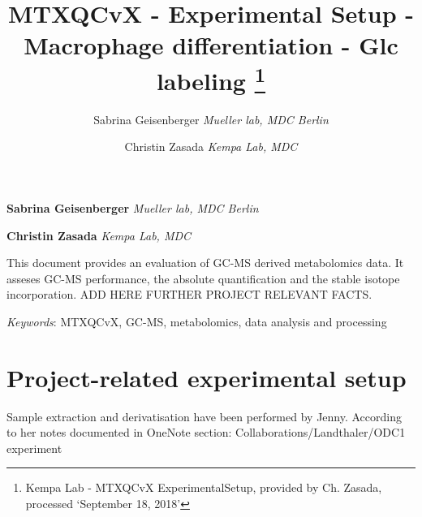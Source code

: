 \documentclass[10pt,]{article}
\title{MTXQCvX - Experimental Setup - Macrophage differentiation - Glc labeling \thanks{Kempa Lab - MTXQCvX ExperimentalSetup, provided by Ch. Zasada, processed
`September 18, 2018'}  }
\author{\Large Sabrina Geisenberger\vspace{0.05in} \newline\normalsize\emph{Mueller lab, MDC Berlin}   \and \Large Christin Zasada\vspace{0.05in} \newline\normalsize\emph{Kempa Lab, MDC}  }
\date{}
\newcommand*{\authorfont}{\fontfamily{phv}\selectfont}
\renewenvironment{abstract}
 {{%
    \setlength{\leftmargin}{0mm}
    \setlength{\rightmargin}{\leftmargin}%
  }%
  \relax}
 {\endlist}
\begin{document}
	
%

{%
\setlength{\parindent}{0pt}
\thispagestyle{plain}
{\fontsize{18}{20}\selectfont\raggedright 
\maketitle  %

}

{
   \vskip 13.5pt\relax \normalsize\fontsize{11}{12} 
\textbf{\authorfont Sabrina Geisenberger} \hskip 15pt \emph{\small Mueller lab, MDC Berlin}   \par \textbf{\authorfont Christin Zasada} \hskip 15pt \emph{\small Kempa Lab, MDC}   

}

}



{
\hypersetup{linkcolor=black}
\setcounter{tocdepth}{2}
\tableofcontents
}




\begin{abstract}

    \hbox{\vrule height .2pt width 39.14pc}

    \vskip 8.5pt %

\noindent This document provides an evaluation of GC-MS derived metabolomics data.
It asseses GC-MS performance, the absolute quantification and the stable
isotope incorporation. ADD HERE FURTHER PROJECT RELEVANT FACTS.


\vskip 8.5pt \noindent \emph{Keywords}: MTXQCvX, GC-MS, metabolomics, data analysis and processing \par

    \hbox{\vrule height .2pt width 39.14pc}



\end{abstract}


\vskip 6.5pt

\noindent  \section{Project-related experimental
setup}\label{project-related-experimental-setup}

Sample extraction and derivatisation have been performed by Jenny.
According to her notes documented in OneNote section:
Collaborations/Landthaler/ODC1 experiment
\end{document}
